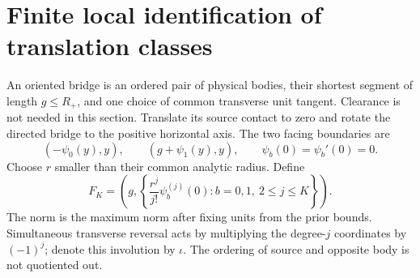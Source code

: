 \section{Finite local identification of translation classes}
\label{sec:fingerprints}
An oriented bridge is an ordered pair of physical bodies, their shortest
segment of length $g\le R_+$, and one choice of common transverse
unit tangent. Clearance is not needed in this section. Translate its
source contact to zero and rotate the directed bridge to the positive
horizontal axis. The two facing boundaries are
\[
 (-\psi_0(y),y),\qquad (g+\psi_1(y),y),\qquad
 \psi_b(0)=\psi_b'(0)=0.
\]
Choose $r$ smaller than their common analytic radius. Define
\begin{equation}\label{eq:signature}
 F_K=\left(g,\left\{\frac{r^j}{j!}\psi_b^{(j)}(0):
                         b=0,1,\ 2\le j\le K\right\}\right).
\end{equation}
The norm is the maximum norm after fixing units from the prior bounds.
Simultaneous transverse reversal acts by multiplying the degree-$j$
coordinates by $(-1)^j$; denote this involution by $\iota$.
The ordering of source and opposite body is not quotiented out.

